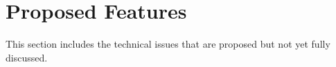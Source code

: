%
%
%
%

\section{Proposed Features}

This section includes the technical issues that are proposed but not yet
fully discussed.

